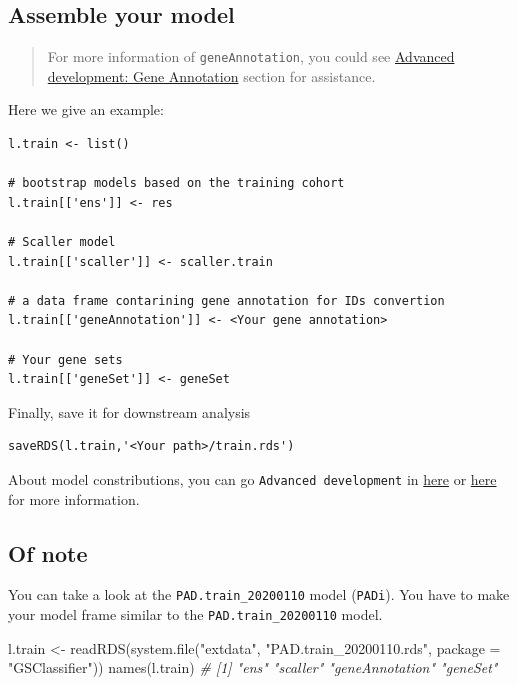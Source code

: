 \documentclass[
  12pt,
]{book}
\newenvironment{Shaded}{\begin{snugshade}}{\end{snugshade}}
\newcommand{\AttributeTok}[1]{\textcolor[rgb]{0.77,0.63,0.00}{#1}}
\newcommand{\CommentTok}[1]{\textcolor[rgb]{0.56,0.35,0.01}{\textit{#1}}}
\newcommand{\FunctionTok}[1]{\textcolor[rgb]{0.00,0.00,0.00}{#1}}
\newcommand{\NormalTok}[1]{#1}
\newcommand{\OtherTok}[1]{\textcolor[rgb]{0.56,0.35,0.01}{#1}}
\newcommand{\StringTok}[1]{\textcolor[rgb]{0.31,0.60,0.02}{#1}}
\begin{document}
\hypertarget{assemble-your-model}{%
\subsection{Assemble your model}\label{assemble-your-model}}

\begin{quote}
For more information of \texttt{geneAnnotation}, you could see \href{https://github.com/huangwb8/GSClassifier/wiki/Advanced-development\#Gene-Annotation}{Advanced development: Gene Annotation} section for assistance.
\end{quote}

Here we give an example:

\begin{verbatim}
l.train <- list()

# bootstrap models based on the training cohort
l.train[['ens']] <- res 

# Scaller model
l.train[['scaller']] <- scaller.train 

# a data frame contarining gene annotation for IDs convertion
l.train[['geneAnnotation']] <- <Your gene annotation>

# Your gene sets
l.train[['geneSet']] <- geneSet
\end{verbatim}

Finally, save it for downstream analysis

\begin{verbatim}
saveRDS(l.train,'<Your path>/train.rds')
\end{verbatim}

About model constributions, you can go \texttt{Advanced\ development} in \href{https://github.com/huangwb8/GSClassifier/wiki/Advanced-development}{here} or \href{http://htmlpreview.github.io/?https://raw.githubusercontent.com/wiki/huangwb8/GSClassifier/Advanced-development.html}{here} for more information.

\hypertarget{of-note-2}{%
\subsection{Of note}\label{of-note-2}}

You can take a look at the \texttt{PAD.train\_20200110} model (\texttt{PADi}). You have to make your model frame similar to the \texttt{PAD.train\_20200110} model.

\begin{Shaded}
\begin{Highlighting}[]
\NormalTok{l.train }\OtherTok{\textless{}{-}} \FunctionTok{readRDS}\NormalTok{(}\FunctionTok{system.file}\NormalTok{(}\StringTok{"extdata"}\NormalTok{, }\StringTok{"PAD.train\_20200110.rds"}\NormalTok{, }\AttributeTok{package =} \StringTok{"GSClassifier"}\NormalTok{))}
\FunctionTok{names}\NormalTok{(l.train)}
\CommentTok{\# [1] "ens"            "scaller"        "geneAnnotation" "geneSet"}
\end{Highlighting}
\end{Shaded}
\end{document}

